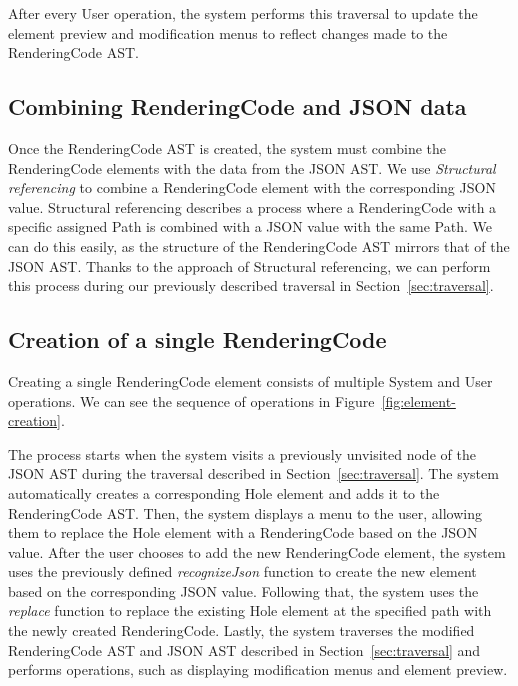 After every User operation, the system performs this traversal to update the element preview and modification menus to reflect changes made to the RenderingCode AST.
\clearpage
\subsection{Combining RenderingCode and JSON data}
Once the RenderingCode AST is created, the system must combine the RenderingCode elements with the data from the JSON AST.
We use \emph{Structural referencing} to combine a RenderingCode element with the corresponding JSON value.
Structural referencing describes a process where a RenderingCode with a specific assigned Path is combined with a JSON value with the same Path.
We can do this easily, as the structure of the RenderingCode AST mirrors that of the JSON AST.
Thanks to the approach of Structural referencing, we can perform this process during our previously described traversal in Section~\ref{sec:traversal}.


\subsection{Creation of a single RenderingCode}

Creating a single RenderingCode element consists of multiple System and User operations.
We can see the sequence of operations in Figure~\ref{fig:element-creation}.

The process starts when the system visits a previously unvisited node of the JSON AST during the traversal described in Section~\ref{sec:traversal}.
The system automatically creates a corresponding Hole element and adds it to the RenderingCode AST.
Then, the system displays a menu to the user, allowing them to replace the Hole element with a RenderingCode based on the JSON value.
After the user chooses to add the new RenderingCode element, the system uses the previously defined \emph{recognizeJson} function to create the new element based on the corresponding JSON value.
Following that, the system uses the \emph{replace} function to replace the existing Hole element at the specified path with the newly created RenderingCode.
Lastly, the system traverses the modified RenderingCode AST and JSON AST described in Section~\ref{sec:traversal} and performs operations, such as displaying modification menus and element preview.


